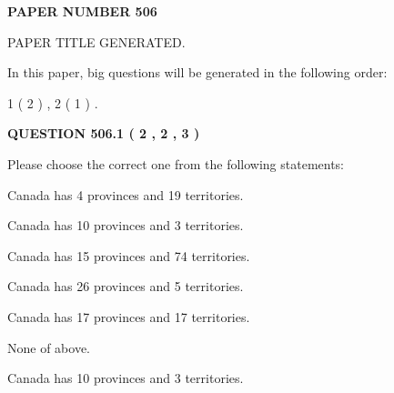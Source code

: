 \documentclass[12pt]{article}
\begin{document}
   
   
   
\newpage 
\setcounter{page}{ 
   506001 } 
   
   
   
   
 {\textbf{ \Large{ PAPER NUMBER  506  }}}
   
   
\vspace{0.2in}
   
   
   
   
   
   
   
   
 \vspace{0.2in}
 
 
 
 
   
   
 PAPER TITLE GENERATED.
   
   
   
\vspace{0.2in}
   
In this paper, big questions will be generated in the following order: 
   
   
   1 ( 2 )
 ,
   2 ( 1 )
 .
  
\vspace{0.2in}
  
{\textbf{\Large{QUESTION
506.1 
 ( 2 , 2 , 3 )
}}}
  
  
Please choose the correct one from the following statements:
 
 
Canada has   4 provinces and  19 territories.
 
 
Canada has 10  provinces and 3 territories.
 
 
Canada has  15 provinces and  74 territories.
 
 
Canada has  26 provinces and  5 territories.
 
 
Canada has  17 provinces and  17 territories.
 
 
 None of above.
 
 
\noindent{}
 
 
Canada has 10  provinces and 3 territories.
 
 
\noindent{}
 
\end{document}
